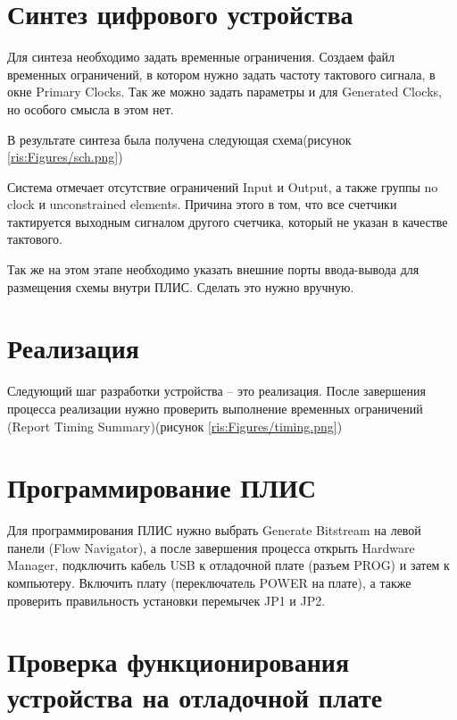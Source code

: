 \begin{sloppypar}
\section{Синтез цифрового устройства} %
Для синтеза необходимо задать временные ограничения. Создаем файл временных ограничений, в котором нужно задать частоту тактового сигнала, в окне Primary Clocks. Так же можно задать параметры и для Generated Clocks, но особого смысла в этом нет.

В результате синтеза была получена следующая схема(рисунок \ref{ris:Figures/sch.png})
\begin{landscape}
\end{landscape}

\newpage
Система отмечает отсутствие ограничений Input и Output, а также группы no clock и unconstrained elements. Причина этого в том, что все счетчики тактируется выходным сигналом другого счетчика, который не указан в качестве тактового.

Так же на этом этапе необходимо указать внешние порты ввода-вывода для размещения схемы внутри ПЛИС. Сделать это нужно вручную.



\section{Реализация} %
Следующий шаг разработки устройства – это реализация.
После завершения процесса реализации нужно проверить выполнение временных ограничений (Report Timing Summary)(рисунок \ref{ris:Figures/timing.png})
\section{Программирование ПЛИС} %

Для программирования ПЛИС нужно выбрать Generate Bitstream на левой панели (Flow Navigator), а после завершения процесса открыть Hardware Manager, подключить кабель USB к отладочной плате (разъем PROG) и затем к компьютеру. Включить плату (переключатель POWER на плате), а также проверить правильность установки перемычек JP1 и JP2. 


\section{Проверка функционирования устройства на отладочной плате} %




\end{sloppypar}
